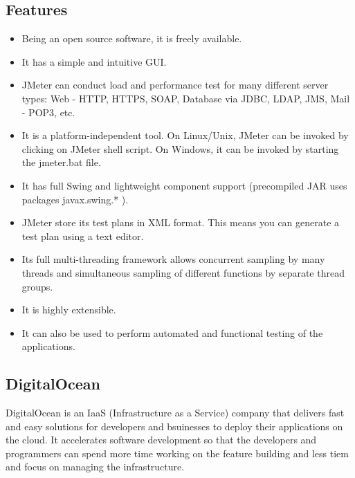 \documentclass[../thesis.tex]{subfiles}
\begin{document}
\subsection*{Features}
\begin{itemize}
	\item Being an open source software, it is freely available.
   
	\item It has a simple and intuitive GUI.
   
	\item JMeter can conduct load and performance test for many different server types: Web - HTTP, HTTPS, SOAP, Database via JDBC, LDAP, JMS, Mail - POP3, etc.
  
	\item It is a platform-independent tool. On Linux/Unix, JMeter can be invoked by clicking on JMeter shell script. On Windows, it can be invoked by starting the jmeter.bat file.
    
	\item It has full Swing and lightweight component support (precompiled JAR uses packages javax.swing.* ).
   
	\item JMeter store its test plans in XML format. This means you can generate a test plan using a text editor.
 
	\item Its full multi-threading framework allows concurrent sampling by many threads and simultaneous sampling of different functions by separate thread groups.
   
	\item It is highly extensible.
   
	\item It can also be used to perform automated and functional testing of the applications.
    
\end{itemize}

\subsection{DigitalOcean}
DigitalOcean is an IaaS (Infrastructure as a Service) company that delivers fast and easy solutions for developers and bsuinesses to deploy their applications on the cloud. It accelerates software development so that the developers and programmers can spend more time working on the feature building and less tiem and focus on managing the infrastructure. 
\newline
\end{document}
